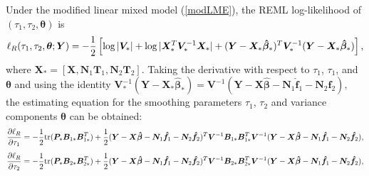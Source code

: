 \documentclass[12pt, notitlepage]{article}
\begin{document}
Under the  modified linear mixed model (\ref{modLME}), the REML log-likelihood of $(\tau_1, \tau_2, \boldsymbol \theta)$ is 
$$
\ell_R(\tau_1, \tau_2, \boldsymbol \theta; \boldsymbol Y) 
 =
 -{1\over 2}  
\left[
 \log |\boldsymbol  V_*|  +  \log |\boldsymbol X_*^T \boldsymbol V_*^{-1} \boldsymbol X_*| 
 +  (\boldsymbol Y - \boldsymbol X_* \boldsymbol {\hat \beta}_*)^T 
 \boldsymbol V_* ^{-1}  
 (\boldsymbol Y - \boldsymbol X_* \boldsymbol   {\hat \beta}_*) 
\right],
$$
where 
$\boldsymbol X_* = [\boldsymbol X, \boldsymbol N_1 \boldsymbol T_1, \boldsymbol N_2 \boldsymbol T_2]$. 
Taking the derivative with respect to $\tau_1$, $\tau_1$, and $\boldsymbol \theta$ and using the identity 
$
\boldsymbol V^{-1}_*
(\boldsymbol Y - \boldsymbol X_* \boldsymbol   {\hat \beta}_*) 
=
\boldsymbol V^{-1} 
(\boldsymbol Y - \boldsymbol X \boldsymbol {\hat\beta} 
- \boldsymbol N_1 \boldsymbol {\hat f}_1
 - \boldsymbol N_2 \boldsymbol {\hat f}_2),
$
the estimating equation  for the smoothing parameters $\tau_1$, $\tau_2$ 
and variance components $\boldsymbol \theta$  can be obtained:
\begin{equation} \label{score_tau1}
{\partial \ell_R  \over \partial \tau_1}
=
- {1 \over 2}
{\rm tr} (\boldsymbol P_* \boldsymbol B_{1*} \boldsymbol B_{1*}^T) 
+ {1 \over 2} 
(\boldsymbol Y - \boldsymbol X \boldsymbol {\hat\beta} - \boldsymbol N_1 \boldsymbol {\hat f}_1
 - \boldsymbol N_2 \boldsymbol {\hat f}_2)^T
\boldsymbol V^{-1}  
\boldsymbol B_{1*} \boldsymbol B_{1*}^T
\boldsymbol V^{-1}  
(\boldsymbol Y - \boldsymbol X \boldsymbol {\hat\beta} - \boldsymbol N_1 \boldsymbol {\hat f}_1
 - \boldsymbol N_2 \boldsymbol {\hat f}_2),
\end{equation}
\begin{equation} \label{score_tau2}
{\partial \ell_R  \over \partial \tau_2}
=
- {1 \over 2}
{\rm tr} (\boldsymbol P_* \boldsymbol B_{2*} \boldsymbol B_{2*}^T)
+ {1 \over 2} 
(\boldsymbol Y - \boldsymbol X \boldsymbol {\hat\beta} - \boldsymbol N_1 \boldsymbol {\hat f}_1
 - \boldsymbol N_2 \boldsymbol {\hat f}_2)^T
\boldsymbol V^{-1}  
\boldsymbol B_{2*} \boldsymbol B_{2*}^T
\boldsymbol V^{-1}  
(\boldsymbol Y - \boldsymbol X \boldsymbol {\hat\beta} - \boldsymbol N_1 \boldsymbol {\hat f}_1
 - \boldsymbol N_2 \boldsymbol {\hat f}_2),
\end{equation}
\end{document}
